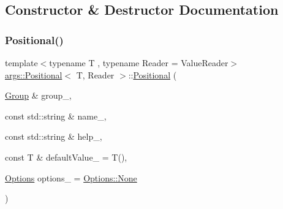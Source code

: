 \subsection{Constructor \& Destructor Documentation}
\mbox{\label{classargs_1_1_positional_ab28805fe2f9364bf9fb2e5f5acf3236d}} 
\subsubsection{\texorpdfstring{Positional()}{Positional()}\hspace{0.1cm}{\footnotesize\ttfamily [1/2]}}
{\footnotesize\ttfamily template$<$typename T , typename Reader  = Value\+Reader$>$ \\
\hyperlink{classargs_1_1_positional}{args\+::\+Positional}$<$ T, Reader $>$\+::\hyperlink{classargs_1_1_positional}{Positional} (\begin{DoxyParamCaption}\item[{\hyperlink{classargs_1_1_group}{Group} \&}]{group\+\_\+,  }\item[{const std\+::string \&}]{name\+\_\+,  }\item[{const std\+::string \&}]{help\+\_\+,  }\item[{const T \&}]{default\+Value\+\_\+ = {\ttfamily T()},  }\item[{\hyperlink{namespaceargs_aa530c0f95194aa275f49a5f299ac9e77}{Options}}]{options\+\_\+ = {\ttfamily \hyperlink{namespaceargs_aa530c0f95194aa275f49a5f299ac9e77a6adf97f83acf6453d4a6a4b1070f3754}{Options\+::\+None}} }\end{DoxyParamCaption})\hspace{0.3cm}{\ttfamily [inline]}}

\mbox{\label{classargs_1_1_positional_a72a7d74c1578cbc6d7ec0d654a0b001a}} 
